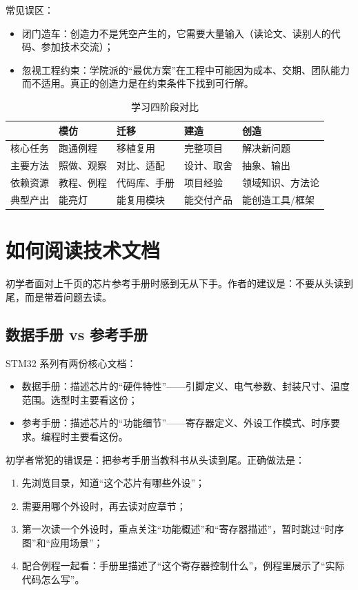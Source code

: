 常见误区：
\begin{itemize}
	\item 闭门造车：创造力不是凭空产生的，它需要大量输入（读论文、读别人的代码、参加技术交流）；
	\item 忽视工程约束：学院派的“最优方案”在工程中可能因为成本、交期、团队能力而不适用。真正的创造力是在约束条件下找到可行解。
\end{itemize}

\begin{table}[htbp]
	\centering
	\caption{学习四阶段对比}
	\label{tab:app-learning-stages}
	\begin{tabularx}{\textwidth}{p{2.2cm}p{2.8cm}p{2.8cm}p{2.8cm} X}
		\toprule
		& 模仿 & 迁移 & 建造 & 创造 \\
		\midrule
		核心任务 & 跑通例程 & 移植复用 & 完整项目 & 解决新问题 \\
		主要方法 & 照做、观察 & 对比、适配 & 设计、取舍 & 抽象、输出 \\
		依赖资源 & 教程、例程 & 代码库、手册 & 项目经验 & 领域知识、方法论 \\
		典型产出 & 能亮灯 & 能复用模块 & 能交付产品 & 能创造工具/框架 \\
		\bottomrule
	\end{tabularx}
\end{table}

\section{如何阅读技术文档}

初学者面对上千页的芯片参考手册时感到无从下手。作者的建议是：不要从头读到尾，而是带着问题去读。

\subsection{数据手册 vs 参考手册}

STM32 系列有两份核心文档：

\begin{itemize}
	\item 数据手册：描述芯片的“硬件特性”——引脚定义、电气参数、封装尺寸、温度范围。选型时主要看这份；
	\item 参考手册：描述芯片的“功能细节”——寄存器定义、外设工作模式、时序要求。编程时主要看这份。
\end{itemize}

初学者常犯的错误是：把参考手册当教科书从头读到尾。正确做法是：

\begin{enumerate}
	\item 先浏览目录，知道“这个芯片有哪些外设”；
	\item 需要用哪个外设时，再去读对应章节；
	\item 第一次读一个外设时，重点关注“功能概述”和“寄存器描述”，暂时跳过“时序图”和“应用场景”；
	\item 配合例程一起看：手册里描述了“这个寄存器控制什么”，例程里展示了“实际代码怎么写”。
\end{enumerate}

